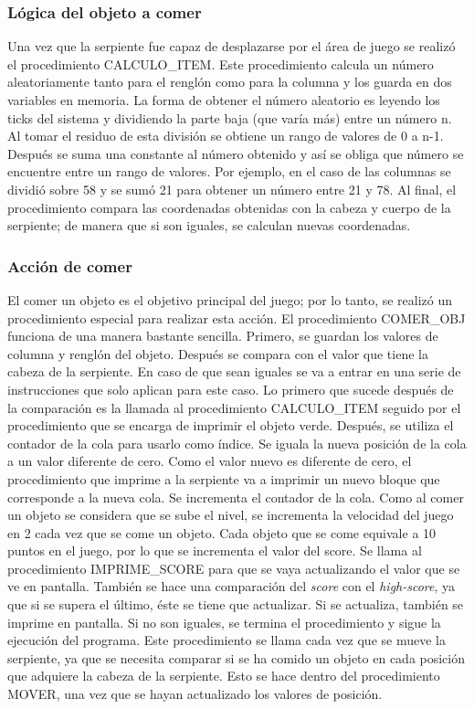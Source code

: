 \documentclass[12pt]{article}
\begin{document}
\subsubsection*{Lógica del objeto a comer}
Una vez que la serpiente fue capaz de desplazarse por el área de juego se realizó el procedimiento CALCULO\_ITEM. Este procedimiento calcula un número aleatoriamente tanto para el renglón como para la columna y los guarda en dos variables en memoria. La forma de obtener el número aleatorio es leyendo los ticks del sistema y dividiendo la parte baja (que varía más) entre un número n. Al tomar el residuo de esta división se obtiene un rango de valores de 0 a n-1. Después se suma una constante al número obtenido y así se obliga que número se encuentre entre un rango de valores. Por ejemplo, en el caso de las columnas se dividió sobre 58 y se sumó 21 para obtener un número entre 21 y 78. Al final, el procedimiento compara las coordenadas obtenidas con la cabeza y cuerpo de la serpiente; de manera que si son iguales, se calculan nuevas coordenadas. 

\subsubsection*{Acción de comer}
El comer un objeto es el objetivo principal del juego; por lo tanto, se realizó un procedimiento especial para realizar esta acción. El procedimiento COMER\_OBJ funciona de una manera bastante sencilla. Primero, se guardan los valores de columna y renglón del objeto. Después se compara con el valor que tiene la cabeza de la serpiente. En caso de que sean iguales se va a entrar en una serie de instrucciones que solo aplican para este caso. Lo primero que sucede después de la comparación es la llamada al procedimiento CALCULO\_ITEM seguido por el procedimiento que se encarga de imprimir el objeto verde. Después, se utiliza el contador de la cola para usarlo como índice. Se iguala la nueva posición de la cola a un valor diferente de cero. Como el valor nuevo es diferente de cero, el procedimiento que imprime a la serpiente va a imprimir un nuevo bloque que corresponde a la nueva cola. Se incrementa el contador de la cola. Como al comer un objeto se considera que se sube el nivel, se incrementa la velocidad del juego en 2 cada vez que se come un objeto. Cada objeto que se come equivale a 10 puntos en el juego, por lo que se incrementa el valor del score. Se llama al procedimiento IMPRIME\_SCORE para que se vaya actualizando el valor que se ve en pantalla. También se hace una comparación del \textit{score} con el \textit{high-score}, ya que si se supera el último, éste se tiene que actualizar. Si se actualiza, también se imprime en pantalla. Si no son iguales, se termina el procedimiento y sigue la ejecución del programa. Este procedimiento se llama cada vez que se mueve la serpiente, ya que se necesita comparar si se ha comido un objeto en cada posición que adquiere la cabeza de la serpiente. Esto se hace dentro del procedimiento MOVER, una vez que se hayan actualizado los valores de posición.  
\end{document}
